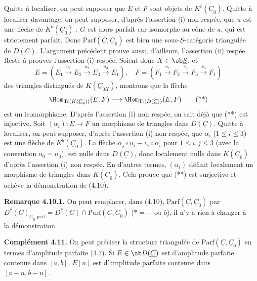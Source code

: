 Quitte à localiser, on peut supposer que $E$ et $F$ sont objets de $K^b(\underline{C}_0)$. Quitte à localiser davantage, on peut supposer, d'après l'assertion (i) non respée, que $u$ est une flèche de $K^b(\underline{C}_0)$ ; $G$ est alors parfait car isomorphe au cône de $u$, qui est strictement parfait. Donc $\mathrm{Parf}(\underline{C}, \underline{C}_0)$ est bien une sous-$\underline{S}$-catégorie triangulée de $D(\underline{C})$. L'argument précédent prouve aussi, d'ailleurs, l'assertion (ii) respée. Reste à prouver l'assertion (i) respée. Soient donc $X \in \ob \underline{S}$, et
\[
E = (E_1 \xrightarrow{u_1} E_2 \xrightarrow{u_2} E_3 \xrightarrow{u_3} E_1), \quad
F = (F_1 \xrightarrow{v_1} F_2 \xrightarrow{v_2} F_3 \xrightarrow{v_3} F_1)
\]
des triangles distingués de $K(\underline{C}_{0X})$, montrons que la flèche
\[
\Hom_{\mathrm{Tr}(K(\underline{C}_0))}(E, F) \longrightarrow \Hom_{\mathrm{Tr}(D(\underline{C}))}(E, F) \tag{**}
\]
est un isomorphisme. D'après l'assertion (i) non respée, on sait déjà que (**) est injective. Soit $(\alpha_i) : E \to F$ un morphisme de triangles dans $D(\underline{C})$. Quitte à localiser, on peut supposer, d'après l'assertion (i) non respée, que $\alpha_i$ ($1 \leqslant i \leqslant 3$) est une flèche de $K^b(\underline{C}_0)$. La flèche $\alpha_j \circ u_i - v_i \circ \alpha_i$ pour $1 \leqslant i, j \leqslant 3$ (avec la convention $u_0 = u_3$), est nulle dans $D(\underline{C})$, donc localement nulle dans $K(\underline{C}_0)$ d'après l'assertion (i) non respée. En d'autres termes, $(\alpha_i)$ définit localement un morphisme de triangles dans $K(\underline{C}_0)$. Cela prouve que (**) est surjective et achève la démonstration de (4.10).

\textbf{Remarque 4.10.1.} On peut remplacer, dans (4.10), $\mathrm{Parf}(\underline{C}, \underline{C}_0)$ par $D^*(\underline{C})_{\underline{C}_0\text{-parf}} = D^*(\underline{C}) \cap \mathrm{Parf}(\underline{C}, \underline{C}_0)$ ($* = -$ ou $b$), il n'y a rien à changer à la démonstration.

\textbf{Complément 4.11.} On peut préciser la structure triangulée de $\mathrm{Parf}(\underline{C}, \underline{C}_0)$ en termes d'amplitude parfaite (4.7). Si $E \in \ob D(\underline{C})$ est d'amplitude parfaite contenue dans $[a, b]$, $E[n]$ est d'amplitude parfaite contenue dans $[a-n, b-n]$.

